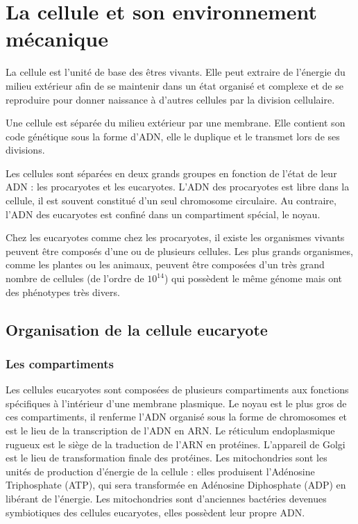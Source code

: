 \documentclass{report}
\begin{document}
\chapter{La cellule et son environnement mécanique}


La cellule est l'unité de base des êtres vivants. Elle peut extraire de l'énergie du milieu extérieur afin de se maintenir dans un état organisé et complexe et de se reproduire pour donner naissance à d'autres cellules par la division cellulaire. 

Une cellule est séparée du milieu extérieur par une membrane. Elle contient son code génétique sous la forme d'ADN, elle le duplique et le transmet lors de ses divisions. 

Les cellules sont séparées en deux grands groupes en fonction de l'état de leur ADN : les procaryotes et les eucaryotes. 
L'ADN des procaryotes est libre dans la cellule, il est souvent constitué d'un seul chromosome circulaire. 
Au contraire, l'ADN des eucaryotes est confiné dans un compartiment spécial, le noyau. 

Chez les eucaryotes comme chez les procaryotes, il existe les organismes vivants peuvent être composés d'une ou de plusieurs cellules. 
Les plus grands organismes, comme les plantes ou les animaux, peuvent être composées d'un très grand nombre de cellules (de l'ordre de $10^{14}$) qui possèdent le même génome mais ont des phénotypes très divers. 

\section{Organisation de la cellule eucaryote}

\subsection{Les compartiments}

Les cellules eucaryotes sont composées de plusieurs compartiments aux fonctions spécifiques à l'intérieur d'une membrane plasmique. Le noyau est le plus gros de ces compartiments, il renferme l'ADN organisé sous la forme de chromosomes et est le lieu de la transcription de l'ADN en ARN. 
Le réticulum endoplasmique rugueux est le siège de la traduction de l'ARN en protéines. 
L'appareil de Golgi est le lieu de transformation finale des protéines. 
Les mitochondries sont les unités de production d'énergie de la cellule : elles produisent l'Adénosine Triphosphate (ATP), qui sera transformée en Adénosine Diphosphate (ADP) en libérant de l'énergie. Les mitochondries sont d'anciennes bactéries devenues symbiotiques des cellules eucaryotes, elles possèdent leur propre ADN. 
\end{document}
